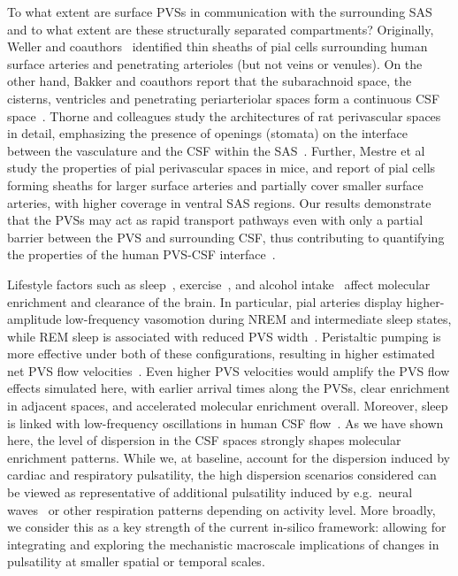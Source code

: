 \documentclass[fleqn,10pt]{wlscirep}
\begin{document}
To what extent are surface PVSs in communication with the surrounding
SAS and to what extent are these structurally separated compartments?
Originally, Weller and coauthors~\cite{zhang1990interrelationships,
  zhang1992directional, weller2005microscopic} identified thin sheaths
of pial cells surrounding human surface arteries and penetrating
arterioles (but not veins or venules). On the other hand, Bakker and
coauthors report that the subarachnoid space, the cisterns, ventricles
and penetrating periarteriolar spaces form a continuous CSF
space~\cite{bedussi2017paravascular}. Thorne and colleagues study the
architectures of rat perivascular spaces in detail, emphasizing the
presence of openings (stomata) on the interface between the
vasculature and the CSF within the SAS~\cite{pizzo2018intrathecal,
  hannocks2018molecular}. Further, Mestre et
al~\cite{mestre2022periarteriolar} study the properties of pial
perivascular spaces in mice, and report of pial cells forming sheaths
for larger surface arteries and partially cover smaller surface
arteries, with higher coverage in ventral SAS regions. Our results
demonstrate that the PVSs may act as rapid transport pathways even
with only a partial barrier between the PVS and surrounding CSF, thus
contributing to quantifying the properties of the human PVS-CSF
interface~\cite{eide2024functional}.


Lifestyle factors such as sleep~\cite{xie2013sleep, miao2024brain,
  bojarskaite2023sleep, eide2021sleep, vinje2023human,
  hauglund2025norepinephrine, larsen2024sleep},
exercise~\cite{holstein2018voluntary, yildiz2022immediate}, and
alcohol intake~\cite{lundgaard2018beneficial} affect molecular
enrichment and clearance of the brain. In particular, pial arteries
display higher-amplitude low-frequency vasomotion during NREM and
intermediate sleep states, while REM sleep is associated with reduced
PVS width~\cite{bojarskaite2023sleep}. Peristaltic pumping is more
effective under both of these configurations, resulting in higher
estimated net PVS flow velocities~\cite{gjerde2023directional}. Even
higher PVS velocities would amplify the PVS flow effects simulated
here, with earlier arrival times along the PVSs, clear enrichment in
adjacent spaces, and accelerated molecular enrichment
overall. Moreover, sleep is linked with low-frequency oscillations in
human CSF flow~\cite{fultz2019coupled}. As we have shown here, the
level of dispersion in the CSF spaces strongly shapes molecular
enrichment patterns. While we, at baseline, account for the dispersion
induced by cardiac and respiratory pulsatility, the high dispersion
scenarios considered can be viewed as representative of additional
pulsatility induced by e.g.~neural waves~\cite{fultz2019coupled,
  williams2023neural} or other respiration patterns depending on
activity level. More broadly, we consider this as a key strength of
the current in-silico framework: allowing for integrating and
exploring the mechanistic macroscale implications of changes in
pulsatility at smaller spatial or temporal scales.
\end{document}
